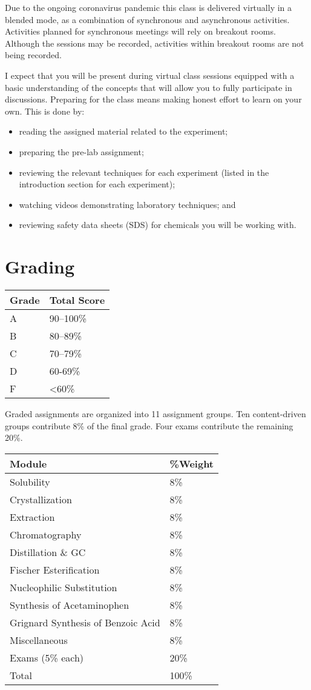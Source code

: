 Due to the ongoing coronavirus pandemic this class is delivered
virtually in a blended mode, as a combination of synchronous and
asynchronous activities. Activities planned for synchronous meetings
will rely on breakout rooms. Although the sessions may be recorded,
activities within breakout rooms are not being recorded.

I expect that you will be present during virtual class sessions equipped
with a basic understanding of the concepts that will allow you to fully
participate in discussions. Preparing for the class means making honest
effort to learn on your own. This is done by:

\begin{itemize}
\tightlist
\item
  reading the assigned material related to the experiment;
\item
  preparing the pre-lab assignment;
\item
  reviewing the relevant techniques for each experiment (listed in the
  introduction section for each experiment);
\item
  watching videos demonstrating laboratory techniques; and
\item
  reviewing safety data sheets (SDS) for chemicals you will be working
  with.
\end{itemize}

\hypertarget{grading}{%
\section{Grading}\label{grading}}

\begin{longtable}[]{@{}ll@{}}
\toprule
Grade & Total Score\tabularnewline
\midrule
\endhead
A & 90--100\%\tabularnewline
B & 80--89\%\tabularnewline
C & 70--79\%\tabularnewline
D & 60-69\%\tabularnewline
F & \textless60\%\tabularnewline
\bottomrule
\end{longtable}

Graded assignments are organized into 11 assignment groups. Ten
content-driven groups contribute 8\% of the final grade. Four exams
contribute the remaining 20\%.

\begin{longtable}[]{@{}ll@{}}
\toprule
Module & \%Weight\tabularnewline
\midrule
\endhead
Solubility & 8\%\tabularnewline
Crystallization & 8\%\tabularnewline
Extraction & 8\%\tabularnewline
Chromatography & 8\%\tabularnewline
Distillation \& GC & 8\%\tabularnewline
Fischer Esterification & 8\%\tabularnewline
Nucleophilic Substitution & 8\%\tabularnewline
Synthesis of Acetaminophen & 8\%\tabularnewline
Grignard Synthesis of Benzoic Acid & 8\%\tabularnewline
Miscellaneous & 8\%\tabularnewline
Exams (5\% each) & 20\%\tabularnewline
Total & 100\%\tabularnewline
\bottomrule
\end{longtable}

